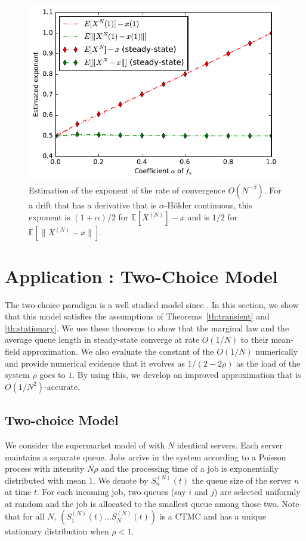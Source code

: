 \documentclass[sigconf]{acmart}
\newcommand\SN{S^{(N)}}
\newcommand\XN{X^{(N)}}
\newcommand\sesp[1]{\mathbb{E}[#1]}
\newcommand\snorm[1]{\|#1\|}
\begin{document}
\begin{figure}[ht]
  \centering
  \includegraphics[width=0.90\linewidth]{exponent_birthDeath}
  \caption{Estimation of the exponent of the rate of convergence
    $O(N^{-\beta})$. For a drift that has a derivative that is
    $\alpha$-Hölder continuous, this exponent is $(1+\alpha)/2$ for
    $\sesp{\XN}-x$ and is $1/2$ for $\sesp{\snorm{\XN-x}}$.}
  \label{fig:expo_BD}
\end{figure}


\section{Application : Two-Choice Model}
\label{sec:two-choice}

The two-choice paradigm is a well studied model since
\cite{mitzenmacher1996power,vvedenskaya1996queueing}. In this section,
we show that this model satisfies the assumptions of
Theorems~\ref{th:transient} and \ref{th:stationary}. We use these
theorems to show that the marginal law and the average queue length in
steady-state converge at rate $O(1/N)$ to their mean-field
approximation. We also evaluate the constant of the $O(1/N)$
numerically and provide numerical evidence that it evolves as
$1/(2-2\rho)$ as the load of the system $\rho$ goes to $1$. By using
this, we develop an improved approximation that is
$O(1/N^2)$-accurate.


\subsection{Two-choice Model}
\label{sec:two-choice-model}

We consider the supermarket model of \cite{mitzenmacher1996power} with
$N$ identical servers. Each server maintains a separate queue. Jobs
arrive in the system according to a Poisson process with intensity
$N\rho$ and the processing time of a job is exponentially distributed
with mean $1$. We denote by $\SN_n(t)$ the queue size of the server
$n$ at time $t$. For each incoming job, two queues (say $i$ and $j$)
are selected uniformly at random and the job is allocated to the
smallest queue among those two. Note that for all $N$,
$(\SN_1(t)\dots \SN_N(t))$ is a CTMC and has a unique stationary
distribution when $\rho<1$.
\end{document}

